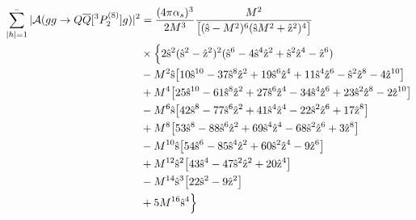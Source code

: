 \documentclass[aps,prc,preprint,superscriptaddress,showpacs,showkeys,amsmath]{revtex4-1}
\begin{document}
\begin{itemize}
\begin{equation}
\begin{split}
\mathop{{\bar{\sum_{|h|=1}}}} | {\cal A}(gg \to Q{\overline Q}[ ^3P_2^{(8)}] g) |^2 &={(4\pi {\alpha_{s}})^3 \over 2 M^3} \frac{M^2}{\bigl[(\hat{\rm s}-M^2)^6 (\hat{\rm s} M^2+\hat{\rm z}^2)^4 \bigr]}\\
                                                                 &  \times \Bigl\{2 \hat{\rm s}^2 (\hat{\rm s}^2-\hat{\rm z}^2)^2 (\hat{\rm s}^6 - 4 \hat{\rm s}^4 \hat{\rm z}^2 + \hat{\rm s}^2 \hat{\rm z}^4 - \hat{\rm z}^6) \\
                                                                 & - M^2 \hat{\rm s} \bigl[ 10 \hat{\rm s}^{10} - 37 \hat{\rm s}^8 \hat{\rm z}^2  + 19 \hat{\rm s}^6 \hat{\rm z}^4 + 11 \hat{\rm s}^4 \hat{\rm z}^6 - \hat{\rm s}^2 \hat{\rm z}^8 - 4 \hat{\rm z}^{10} \bigr] \\
                                                                 & + M^4 \bigl[ 25 \hat{\rm s}^{10} - 61 \hat{\rm s}^8 \hat{\rm z}^2  + 27 \hat{\rm s}^6  \hat{\rm z}^4 - 34 \hat{\rm s}^4 \hat{\rm z}^6 + 23 \hat{\rm s}^2 \hat{\rm z}^8 - 2 \hat{\rm z}^{10} \bigr] \\
                                                                 & - M^6 \hat{\rm s} \bigl[ 42 \hat{\rm s}^8 - 77 \hat{\rm s}^6 \hat{\rm z}^2 + 41 \hat{\rm s}^4 \hat{\rm z}^4 - 22 \hat{\rm s}^2 \hat{\rm z}^6 + 17 \hat{\rm z}^8 \bigr] \\
                                                                 & + M^8 \bigl[ 53 \hat{\rm s}^8 - 88 \hat{\rm s}^6 \hat{\rm z}^2 + 69 \hat{\rm s}^4 \hat{\rm z}^4 - 68 \hat{\rm s}^2 \hat{\rm z}^6 + 3 \hat{\rm z}^8 \bigr] \\
                                                                 & - M^{10} \hat{\rm s} \bigl[ 54 \hat{\rm s}^6 - 85 \hat{\rm s}^4 \hat{\rm z}^2 + 60 \hat{\rm s}^2 \hat{\rm z}^4 - 9 \hat{\rm z}^6 \bigr] \\
                                                                 & + M^{12} \hat{\rm s}^2 \bigl[ 43 \hat{\rm s}^4 - 47 \hat{\rm s}^2 \hat{\rm z}^2 + 20 \hat{\rm z}^4 \bigr] \\
                                                                 & - M^{14} \hat{\rm s}^3 \bigl[22 \hat{\rm s}^2 - 9 \hat{\rm z}^2\bigr]\\ 
                                                                 & + 5 M^{16} \hat{\rm s}^4 \Bigr\} 
\end{split}  
\end{equation}


\end{itemize}
\end{document}
